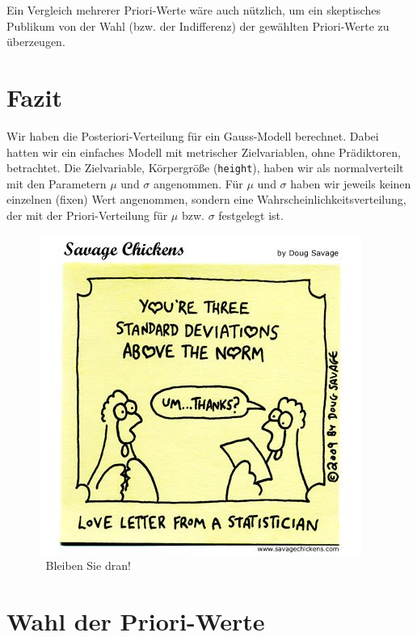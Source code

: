 \documentclass[
  a4paper,
  DIV=11]{scrreprt}
\theoremstyle{definition}
\theoremstyle{remark}
\begin{document}
Ein Vergleich mehrerer Priori-Werte wäre auch nützlich, um ein
skeptisches Publikum von der Wahl (bzw. der Indifferenz) der gewählten
Priori-Werte zu überzeugen.

\hypertarget{fazit-2}{%
\section{Fazit}\label{fazit-2}}

Wir haben die Posteriori-Verteilung für ein Gauss-Modell berechnet.
Dabei hatten wir ein einfaches Modell mit metrischer Zielvariablen, ohne
Prädiktoren, betrachtet. Die Zielvariable, Körpergröße
(\texttt{height}), haben wir als normalverteilt mit den Parametern
\(\mu\) und \(\sigma\) angenommen. Für \(\mu\) und \(\sigma\) haben wir
jeweils keinen einzelnen (fixen) Wert angenommen, sondern eine
Wahrscheinlichkeitsverteilung, der mit der Priori-Verteilung für \(\mu\)
bzw. \(\sigma\) festgelegt ist.

\begin{figure}

{\centering \includegraphics{./img/chicken_standard_deviation.jpg}

}

\caption{🧡 Bleiben Sie dran!}

\end{figure}

\hypertarget{wahl-der-priori-werte}{%
\section{Wahl der Priori-Werte}\label{wahl-der-priori-werte}}
\end{document}

